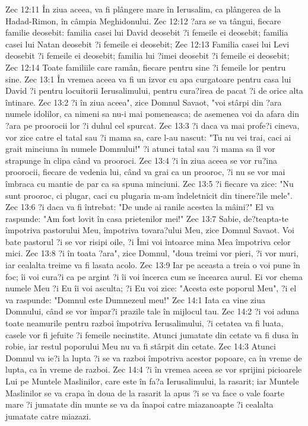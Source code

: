 Zec 12:11  În ziua aceea, va fi plângere mare în Ierusalim, ca plângerea de la Hadad-Rimon, în câmpia Meghidonului.
Zec 12:12  ?ara se va tângui, fiecare familie deosebit: familia casei lui David deosebit ?i femeile ei deosebit; familia casei lui Natan deosebit ?i femeile ei deosebit;
Zec 12:13  Familia casei lui Levi deosebit ?i femeile ei deosebit; familia lui ?imei deosebit ?i femeile ei deosebit;
Zec 12:14  Toate familiile care ramân, fiecare pentru sine ?i femeile lor pentru sine.
Zec 13:1  În vremea aceea va fi un izvor cu apa curgatoare pentru casa lui David ?i pentru locuitorii Ierusalimului, pentru cura?irea de pacat ?i de orice alta întinare.
Zec 13:2  ?i în ziua aceea", zice Domnul Savaot, "voi stârpi din ?ara numele idolilor, ca nimeni sa nu-i mai pomeneasca; de asemenea voi da afara din ?ara pe proorocii lor ?i duhul cel spurcat.
Zec 13:3  ?i daca va mai profe?i cineva, vor zice catre el tatal sau ?i mama sa, care l-au nascut: "Tu nu vei trai, caci ai grait minciuna în numele Domnului!" ?i atunci tatal sau ?i mama sa îl vor strapunge în clipa când va prooroci.
Zec 13:4  ?i în ziua aceea se vor ru?ina proorocii, fiecare de vedenia lui, când va grai ca un prooroc, ?i nu se vor mai îmbraca cu mantie de par ca sa spuna minciuni.
Zec 13:5  ?i fiecare va zice: "Nu sunt prooroc, ci plugar, caci cu plugaria m-am îndeletnicit din tinere?ile mele".
Zec 13:6  ?i daca va fi întrebat: "De unde ai ranile acestea la mâini?" El va raspunde: "Am fost lovit în casa prietenilor mei!"
Zec 13:7  Sabie, de?teapta-te împotriva pastorului Meu, împotriva tovara?ului Meu, zice Domnul Savaot. Voi bate pastorul ?i se vor risipi oile, ?i Îmi voi întoarce mina Mea împotriva celor mici.
Zec 13:8  ?i în toata ?ara", zice Domnul, "doua treimi vor pieri, ?i vor muri, iar cealalta treime va fi lasata acolo.
Zec 13:9  Iar pe aceasta a treia o voi pune în foc; îi voi cura?i ca pe argint ?i îi voi încerca cum se încearca aurul. Ei vor chema numele Meu ?i Eu îi voi asculta; ?i Eu voi zice: "Acesta este poporul Meu", ?i el va raspunde: "Domnul este Dumnezeul meu!"
Zec 14:1  Iata ca vine ziua Domnului, când se vor împar?i prazile tale în mijlocul tau.
Zec 14:2  ?i voi aduna toate neamurile pentru razboi împotriva Ierusalimului, ?i cetatea va fi luata, casele vor fi jefuite ?i femeile necinstite. Atunci jumatate din cetate va fi dusa în robie, iar restul poporului Meu nu va fi stârpit din cetate.
Zec 14:3  Atunci Domnul va ie?i la lupta ?i se va razboi împotriva acestor popoare, ca în vreme de lupta, ca în vreme de razboi.
Zec 14:4  ?i în vremea aceea se vor sprijini picioarele Lui pe Muntele Maslinilor, care este în fa?a Ierusalimului, la rasarit; iar Muntele Maslinilor se va crapa în doua de la rasarit la apus ?i se va face o vale foarte mare ?i jumatate din munte se va da înapoi catre miazanoapte ?i cealalta jumatate catre miazazi.
